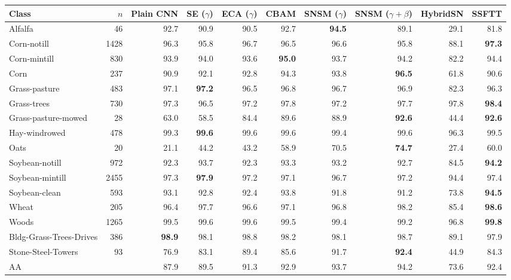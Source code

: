 \begin{tabular}{lrrrrrrrrr}
\toprule
Class & $n$ & Plain CNN & SE ($\gamma$) & ECA ($\gamma$) & CBAM & SNSM ($\gamma$) & SNSM ($\gamma{+}\beta$) & HybridSN & SSFTT \\
\midrule
Alfalfa & 46 & 92.7 & 90.9 & 90.5 & 92.7 & \textbf{94.5} & 89.1 & 29.1 & 81.8 \\
Corn-notill & 1428 & 96.3 & 95.8 & 96.7 & 96.5 & 96.6 & 95.8 & 88.1 & \textbf{97.3} \\
Corn-mintill & 830 & 93.9 & 94.0 & 93.6 & \textbf{95.0} & 93.7 & 94.2 & 82.2 & 94.4 \\
Corn & 237 & 90.9 & 92.1 & 92.8 & 94.3 & 93.8 & \textbf{96.5} & 61.8 & 90.6 \\
Grass-pasture & 483 & 97.1 & \textbf{97.2} & 96.5 & 96.8 & 96.7 & 96.9 & 82.3 & 96.3 \\
Grass-trees & 730 & 97.3 & 96.5 & 97.2 & 97.8 & 97.2 & 97.7 & 97.8 & \textbf{98.4} \\
Grass-pasture-mowed & 28 & 63.0 & 58.5 & 84.4 & 89.6 & 88.9 & \textbf{92.6} & 44.4 & \textbf{92.6} \\
Hay-windrowed & 478 & 99.3 & \textbf{99.6} & 99.6 & 99.6 & 99.4 & 99.6 & 96.3 & 99.5 \\
Oats & 20 & 21.1 & 44.2 & 43.2 & 58.9 & 70.5 & \textbf{74.7} & 27.4 & 60.0 \\
Soybean-notill & 972 & 92.3 & 93.7 & 92.3 & 93.3 & 93.2 & 92.7 & 84.5 & \textbf{94.2} \\
Soybean-mintill & 2455 & 97.3 & \textbf{97.9} & 97.2 & 97.1 & 96.7 & 97.2 & 94.4 & 97.4 \\
Soybean-clean & 593 & 93.1 & 92.8 & 92.4 & 93.8 & 91.8 & 91.2 & 73.8 & \textbf{94.5} \\
Wheat & 205 & 96.4 & 97.7 & 96.6 & 97.1 & 96.8 & 98.2 & 85.4 & \textbf{98.6} \\
Woods & 1265 & 99.5 & 99.6 & 99.6 & 99.5 & 99.4 & 99.2 & 96.8 & \textbf{99.8} \\
Bldg-Grass-Trees-Drives & 386 & \textbf{98.9} & 98.1 & 98.8 & 98.2 & 98.1 & 98.7 & 89.1 & 97.9 \\
Stone-Steel-Towers & 93 & 76.9 & 83.1 & 89.4 & 85.6 & 91.7 & \textbf{92.4} & 44.9 & 84.3 \\
\midrule
AA & & 87.9 & 89.5 & 91.3 & 92.9 & 93.7 & 94.2 & 73.6 & 92.4 \\
\bottomrule
\end{tabular}
